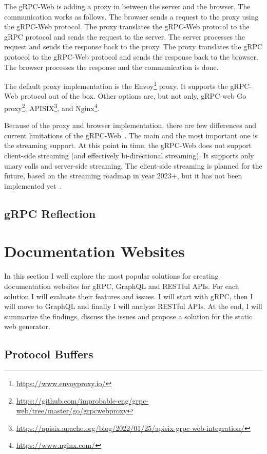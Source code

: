 The gRPC-Web is adding a proxy in between the server and the browser.
The communication works as follows.
The browser sends a request to the proxy using the gRPC-Web protocol.
The proxy translates the gRPC-Web protocol to the gRPC protocol and sends the request to the server.
The server processes the request and sends the response back to the proxy.
The proxy translates the gRPC protocol to the gRPC-Web protocol and sends the response back to the browser.
The browser processes the response and the communication is done.
\cite{grpc-protocol-web}

The default proxy implementation is the Envoy\footnote{\url{https://www.envoyproxy.io/}} proxy.
It supports the gRPC-Web protocol out of the box.
Other options are, but not only, gRPC-web Go proxy\footnote{\url{https://github.com/improbable-eng/grpc-web/tree/master/go/grpcwebproxy}}, APISIX\footnote{\url{https://apisix.apache.org/blog/2022/01/25/apisix-grpc-web-integration/}}, and Nginx\footnote{\url{https://www.nginx.com/}}.


Because of the proxy and browser implementation, there are few differences and current limitations of the gRPC-Web~\cite{grpc-web}.
The main and the most important one is the streaming support.
At this point in time, the gRPC-Web does not support client-side streaming (and effectively bi-directional streaming).
It supports only unary calls and server-side streaming.
The client-side streaming is planned for the future, based on the streaming roadmap in year 2023+, but it has not been implemented yet~\cite{grpc-web-streaming-roadmap}.

\subsection{gRPC Reflection}


\section{Documentation Websites}
In this section I well explore the most popular solutions for creating documentation websites for gRPC, GraphQL and RESTful APIs.
For each solution I will evaluate their features and issues.
I will start with gRPC, then I will move to GraphQL and finally I will analyze RESTful APIs.
At the end, I will summarize the findings, discuss the issues and propose a solution for the static web generator.

\subsection{Protocol Buffers}

